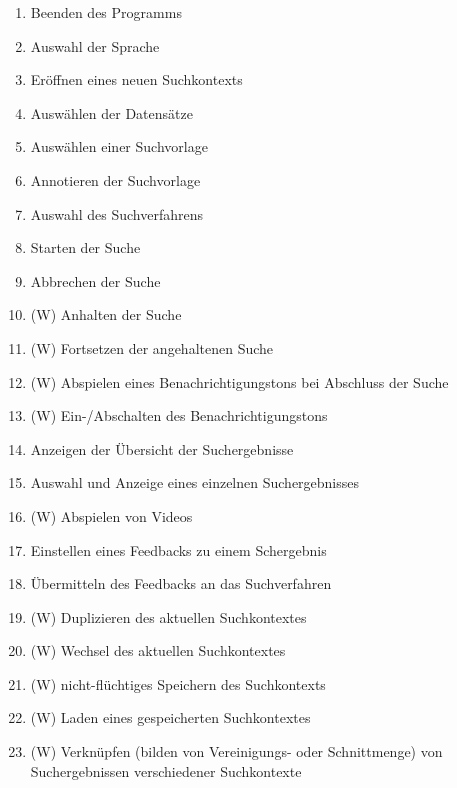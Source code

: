 \begin{enumerate} [label=\bfseries /F \arabic*0/]
	\item Beenden des Programms
	\item Auswahl der Sprache
	\item Er\"offnen eines neuen Suchkontexts
	\item Ausw\"ahlen der Datens\"atze
	\item Ausw\"ahlen einer Suchvorlage
	\item Annotieren der Suchvorlage
	\item Auswahl des Suchverfahrens
	\item Starten der Suche
	\item Abbrechen der Suche
	\item (W) Anhalten der Suche
	\item (W) Fortsetzen der angehaltenen Suche
	\item (W) Abspielen eines Benachrichtigungstons bei Abschluss der Suche
	\item (W) Ein-/Abschalten des Benachrichtigungstons
	\item Anzeigen der \"Ubersicht der Suchergebnisse
	\item Auswahl und Anzeige eines einzelnen Suchergebnisses
	\item (W) Abspielen von Videos
	\item Einstellen eines Feedbacks zu einem Schergebnis
	\item \"Ubermitteln des Feedbacks an das Suchverfahren
	\item (W) Duplizieren des aktuellen Suchkontextes
	\item (W) Wechsel des aktuellen Suchkontextes
	\item (W) nicht-fl\"uchtiges Speichern des Suchkontexts
	\item (W) Laden eines gespeicherten Suchkontextes
	\item (W) Verkn\"upfen (bilden von Vereinigungs- oder Schnittmenge) von Suchergebnissen verschiedener Suchkontexte
\end{enumerate}
